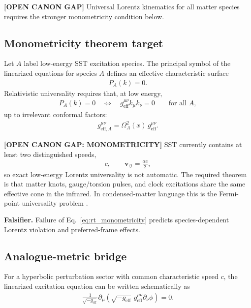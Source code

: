 \textbf{[OPEN CANON GAP]} Universal Lorentz kinematics for all matter species
requires the stronger monometricity condition below.

\subsection{Monometricity theorem target}

Let \(A\) label low-energy SST excitation species. The principal symbol of the
linearized equations for species \(A\) defines an effective characteristic
surface
\begin{align}
    P_A(k)=0 .
\end{align}
Relativistic universality requires that, at low energy,
\begin{align}
    P_A(k)=0
    \quad\Longleftrightarrow\quad
    g_{\mathrm{eff}}^{\mu\nu} k_\mu k_\nu=0
    \qquad
    \text{for all } A ,
    \label{eq:rt_monometricity}
\end{align}
up to irrelevant conformal factors:
\begin{align}
    g^{\mu\nu}_{\mathrm{eff},A}
    =
    \Omega_A^2(x)\,
    g^{\mu\nu}_{\mathrm{eff}} .
\end{align}

\textbf{[OPEN CANON GAP: MONOMETRICITY]} SST currently contains at least two
distinguished speeds,
\begin{align}
    c,
    \qquad
    \mathbf{v}_{\!\boldsymbol{\circlearrowleft}}
    =
    \frac{\alpha c}{2},
\end{align}
so exact low-energy Lorentz universality is not automatic. The required theorem
is that matter knots, gauge/torsion pulses, and clock excitations share the
same effective cone in the infrared. In condensed-matter language this is the
Fermi-point universality problem \cite{Volovik2003}.

\textbf{Falsifier.} Failure of Eq.~\eqref{eq:rt_monometricity} predicts
species-dependent Lorentz violation and preferred-frame effects.

\subsection{Analogue-metric bridge}

For a hyperbolic perturbation sector with common characteristic speed \(c\),
the linearized excitation equation can be written schematically as
\begin{align}
    \frac{1}{\sqrt{-g_{\mathrm{eff}}}}
    \partial_\mu
    \left(
        \sqrt{-g_{\mathrm{eff}}}\,
        g_{\mathrm{eff}}^{\mu\nu}
        \partial_\nu \phi
    \right)
    =
    0 .
    \label{eq:rt_analogue_metric}
\end{align}

